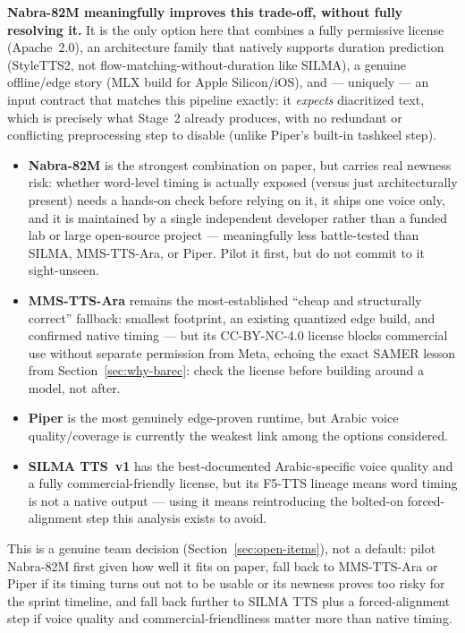 \documentclass[11pt,a4paper]{article}
\begin{document}
\textbf{Nabra-82M meaningfully improves this trade-off, without fully
resolving it.} It is the only option here that combines a fully permissive
license (Apache~2.0), an architecture family that natively supports duration
prediction (StyleTTS2, not flow-matching-without-duration like SILMA), a
genuine offline/edge story (MLX build for Apple Silicon/iOS), and --- uniquely
--- an input contract that matches this pipeline exactly: it \emph{expects}
diacritized text, which is precisely what Stage~2 already produces, with no
redundant or conflicting preprocessing step to disable (unlike Piper's
built-in tashkeel step).

\begin{itemize}[leftmargin=1.4em]
  \item \textbf{Nabra-82M} is the strongest combination on paper, but carries
  real newness risk: whether word-level timing is actually exposed (versus
  just architecturally present) needs a hands-on check before relying on it,
  it ships one voice only, and it is maintained by a single independent
  developer rather than a funded lab or large open-source project ---
  meaningfully less battle-tested than SILMA, MMS-TTS-Ara, or Piper. Pilot it
  first, but do not commit to it sight-unseen.
  \item \textbf{MMS-TTS-Ara} remains the most-established ``cheap and
  structurally correct'' fallback: smallest footprint, an existing quantized
  edge build, and confirmed native timing --- but its CC-BY-NC-4.0 license
  blocks commercial use without separate permission from Meta, echoing the
  exact SAMER lesson from Section~\ref{sec:why-barec}: check the license
  before building around a model, not after.
  \item \textbf{Piper} is the most genuinely edge-proven runtime, but
  Arabic voice quality/coverage is currently the weakest link among the
  options considered.
  \item \textbf{SILMA TTS~v1} has the best-documented Arabic-specific voice
  quality and a fully commercial-friendly license, but its F5-TTS lineage
  means word timing is not a native output --- using it means reintroducing
  the bolted-on forced-alignment step this analysis exists to avoid.
\end{itemize}

This is a genuine team decision (Section~\ref{sec:open-items}), not a
default: pilot Nabra-82M first given how well it fits on paper, fall back to
MMS-TTS-Ara or Piper if its timing turns out not to be usable or its
newness proves too risky for the sprint timeline, and fall back further to
SILMA TTS plus a forced-alignment step if voice quality and
commercial-friendliness matter more than native timing.
\end{document}
